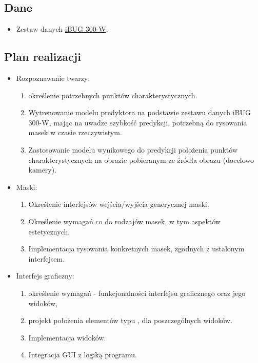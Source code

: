 \subsection{Dane}
\begin{itemize}
\item Zestaw danych \href{https://ibug.doc.ic.ac.uk/resources/300-W/}{iBUG 300-W}\cite{300-w}. 
\end{itemize}


\subsection{Plan realizacji}
\begin{itemize}

    \item Rozpoznawanie twarzy: 
    \begin{enumerate}
        \item określenie potrzebnych punktów charakterystycznych.
        \item Wytrenowanie modelu predyktora na podstawie zestawu danych iBUG 300-W\cite{300-w}, mając na uwadze szybkość predykcji, potrzebną do rysowania masek w czasie rzeczywistym. 
        \item Zastosowanie modelu wynikowego do predykcji położenia punktów charakterystycznych na obrazie pobieranym ze źródła obrazu (docelowo kamery).
    \end{enumerate}
  
    \item Maski:
    \begin{enumerate}
        \item Określenie interfejsów wejścia/wyjścia generycznej maski.
        \item Określenie wymagań co do rodzajów masek, w tym aspektów estetycznych.
        \item Implementacja rysowania konkretnych masek, zgodnych z ustalonym interfejsem.
    \end{enumerate}
  
    \item Interfejs graficzny:
    \begin{enumerate}
        \item określenie wymagań - funkcjonalności interfejsu graficznego oraz jego widoków,
        \item projekt położenia elementów typu , dla poszczególnych widoków.
        \item Implementacja widoków.
        \item Integracja GUI z logiką programu.
    \end{enumerate}

\end{itemize} 
